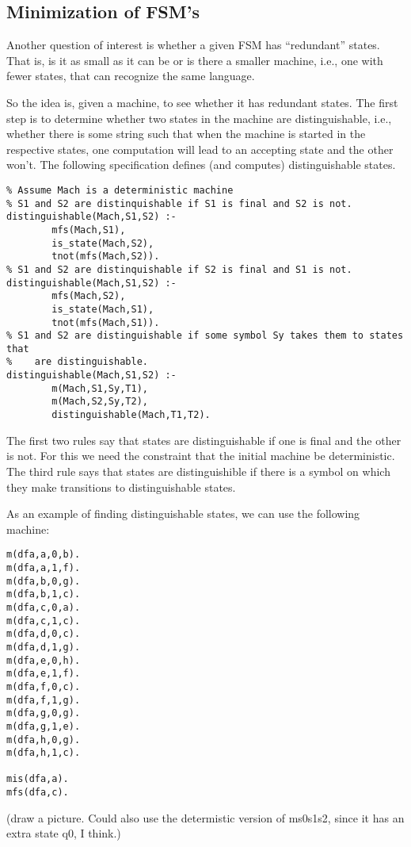 \subsection{Minimization of FSM's}

Another question of interest is whether a given FSM has ``redundant''
states.  That is, is it as small as it can be or is there a smaller
machine, i.e., one with fewer states, that can recognize the same
language.

So the idea is, given a machine, to see whether it has redundant
states.  The first step is to determine whether two states in the
machine are distinguishable, i.e., whether there is some string such
that when the machine is started in the respective states, one
computation will lead to an accepting state and the other won't.  The
following specification defines (and computes) distinguishable states.
\begin{verbatim}
% Assume Mach is a deterministic machine
% S1 and S2 are distinquishable if S1 is final and S2 is not.
distinguishable(Mach,S1,S2) :-
        mfs(Mach,S1),
        is_state(Mach,S2),
        tnot(mfs(Mach,S2)).
% S1 and S2 are distinquishable if S2 is final and S1 is not.
distinguishable(Mach,S1,S2) :-
        mfs(Mach,S2),
        is_state(Mach,S1),
        tnot(mfs(Mach,S1)).
% S1 and S2 are distinguishable if some symbol Sy takes them to states that
%    are distinguishable.
distinguishable(Mach,S1,S2) :-
        m(Mach,S1,Sy,T1),
        m(Mach,S2,Sy,T2),
        distinguishable(Mach,T1,T2).
\end{verbatim}

The first two rules say that states are distinguishable if one is
final and the other is not.  For this we need the constraint that the
initial machine be deterministic.  The third rule says that states are
distinguishible if there is a symbol on which they make transitions to
distinguishable states.

As an example of finding distinguishable states, we can use the
following machine:
\begin{verbatim}
m(dfa,a,0,b).
m(dfa,a,1,f).
m(dfa,b,0,g).
m(dfa,b,1,c).
m(dfa,c,0,a).
m(dfa,c,1,c).
m(dfa,d,0,c).
m(dfa,d,1,g).
m(dfa,e,0,h).
m(dfa,e,1,f).
m(dfa,f,0,c).
m(dfa,f,1,g).
m(dfa,g,0,g).
m(dfa,g,1,e).
m(dfa,h,0,g).
m(dfa,h,1,c).

mis(dfa,a).
mfs(dfa,c).
\end{verbatim}
(draw a picture.  Could also use the determistic version of ms0s1s2,
since it has an extra state {q0}, I think.)

